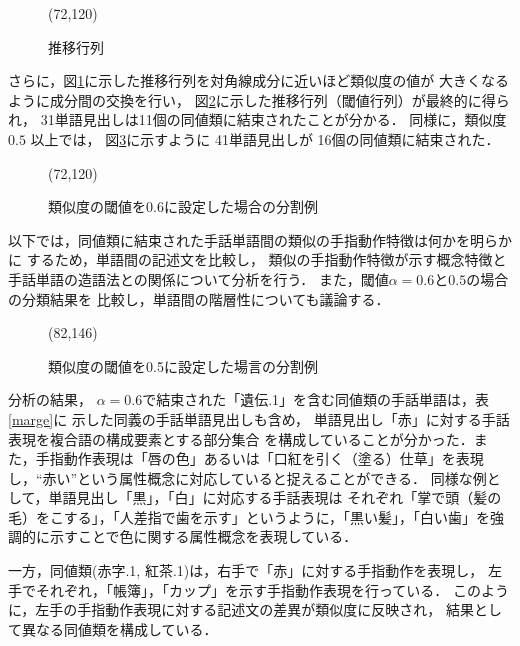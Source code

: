 \begin{figure}[htb]
\begin{center}
\atari(72,120)
\end{center}
\caption{推移行列}
\label{tr_matrix2}
\end{figure}

さらに，図\ref{tr_matrix2}に示した推移行列を対角線成分に近いほど類似度の値が
大きくなるように成分間の交換を行い，
図\ref{tr_matrix3}に示した推移行列（閾値行列）が最終的に得られ，
31単語見出しは11個の同値類に結束されたことが分かる．
同様に，類似度 $0.5$ 以上では，
図\ref{tr_matrix5}に示すように 41単語見出しが 16個の同値類に結束された．

\begin{figure}[htb]
\begin{center}
\atari(72,120)
\end{center}
\caption{類似度の閾値を0.6に設定した場合の分割例}
\label{tr_matrix3}
\end{figure}

以下では，同値類に結束された手話単語間の類似の手指動作特徴は何かを明らかに
するため，単語間の記述文を比較し，
類似の手指動作特徴が示す概念特徴と手話単語の造語法との関係について分析を行う．
また，閾値$\alpha=0.6$と$0.5$の場合の分類結果を
比較し，単語間の階層性についても議論する．

\begin{figure}[htb]
\begin{center}
\atari(82,146)
\end{center}
\caption{類似度の閾値を0.5に設定した場言の分割例}
\label{tr_matrix5}
\end{figure}

分析の結果，
$\alpha=0.6$で結束された「遺伝.1」を含む同値類の手話単語は，表\ref{marge}に
示した同義の手話単語見出しも含め，
単語見出し「赤」に対する手話表現を複合語の構成要素とする部分集合
を構成していることが分かった．また，手指動作表現は「唇の色」あるいは「口紅を引く（塗る）仕草」を表現し，``赤い''という属性概念に対応していると捉えることができる．
同様な例として，単語見出し「黒」，「白」に対応する手話表現は
それぞれ「掌で頭（髪の毛）をこする」，「人差指で歯を示す」というように，「黒い髪」，「白い歯」を強調的に示すことで色に関する属性概念を表現している．

一方，同値類(赤字.1, 紅茶.1)は，右手で「赤」に対する手指動作を表現し，
左手でそれぞれ，「帳簿」，「カップ」を示す手指動作表現を行っている．
このように，左手の手指動作表現に対する記述文の差異が類似度に反映され，
結果として異なる同値類を構成している．

